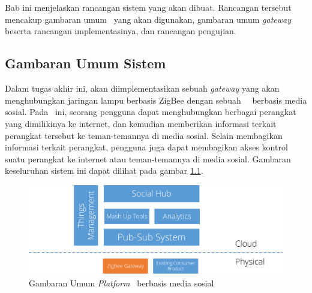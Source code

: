 \chapter{\babTiga}
Bab ini menjelaskan rancangan sistem yang akan dibuat. Rancangan tersebut mencakup gambaran umum \plat~yang akan digunakan, gambaran umum \textit{gateway} beserta rancangan implementasinya, dan rancangan pengujian.

\section{Gambaran Umum Sistem}
Dalam tugas akhir ini, akan diimplementasikan sebuah \textit{gateway} yang akan menghubungkan jaringan lampu berbasis ZigBee dengan sebuah \plat~\iot~berbasis media sosial. Pada \plat~ini, seorang pengguna dapat menghubungkan berbagai perangkat  yang dimilikinya ke internet, dan kemudian memberikan informasi terkait perangkat tersebut ke teman-temannya di media sosial. Selain membagikan informasi terkait perangkat, pengguna juga dapat membagikan akses kontrol suatu perangkat ke internet atau teman-temannya di media sosial. Gambaran keseluruhan sistem ini dapat dilihat pada gambar \ref{fig:rancangan-siot}.

\begin{figure}
	\centering
	\includegraphics[width=.9\textwidth]{pics/rancangan-siot.PNG}
	\caption{Gambaran Umum \textit{Platform} \IOT~berbasis media sosial}
	\label{fig:rancangan-siot}
\end{figure}

